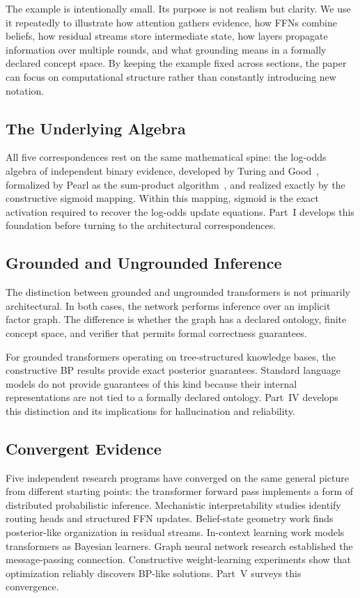 The example is intentionally small. Its purpose is not realism but
clarity. We use it repeatedly to illustrate how attention gathers
evidence, how FFNs combine beliefs, how residual streams store
intermediate state, how layers propagate information over multiple
rounds, and what grounding means in a formally declared concept space.
By keeping the example fixed across sections, the paper can focus on
computational structure rather than constantly introducing new
notation.

\subsection*{The Underlying Algebra}

All five correspondences rest on the same mathematical spine: the
log-odds algebra of independent binary evidence, developed by Turing
and Good~\cite{good1950probability}, formalized by Pearl as the
sum-product algorithm~\cite{pearl1988probabilistic}, and realized
exactly by the constructive sigmoid mapping. Within this mapping,
sigmoid is the exact activation required to recover the log-odds
update equations. Part~I develops this foundation before turning to
the architectural correspondences.

\subsection*{Grounded and Ungrounded Inference}

The distinction between grounded and ungrounded transformers is not
primarily architectural. In both cases, the network performs inference
over an implicit factor graph. The difference is whether the graph has
a declared ontology, finite concept space, and verifier that permits
formal correctness guarantees.

For grounded transformers operating on tree-structured knowledge
bases, the constructive BP results provide exact posterior guarantees.
Standard language models do not provide guarantees of this kind
because their internal representations are not tied to a formally
declared ontology. Part~IV develops this distinction and its
implications for hallucination and reliability.

\subsection*{Convergent Evidence}

Five independent research programs have converged on the same general
picture from different starting points: the transformer forward pass
implements a form of distributed probabilistic inference. Mechanistic
interpretability studies identify routing heads and structured FFN
updates. Belief-state geometry work finds posterior-like organization
in residual streams. In-context learning work models transformers as
Bayesian learners. Graph neural network research established the
message-passing connection. Constructive weight-learning experiments
show that optimization reliably discovers BP-like solutions. Part~V
surveys this convergence.

